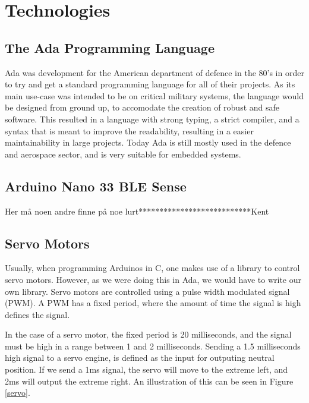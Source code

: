 \documentclass{article}
\begin{document}
\section{Technologies}

\subsection{The Ada Programming Language}
Ada was development for the American department of defence in the 80's in order to try and get a standard programming language for all of their projects. As its main use-case was intended to be on critical military systems, the language would be designed from ground up, to accomodate the creation of robust and safe software. This resulted in a language with strong typing, a strict compiler, and a syntax that is meant to improve the readability, resulting in a easier maintainability in large projects. Today Ada is still mostly used in the defence and aerospace sector, and is very suitable for embedded systems.\\


\subsection{Arduino Nano 33 BLE Sense}

Her må noen andre finne på noe lurt***************************Kent



\subsection{Servo Motors}
Usually, when programming Arduinos in C, one makes use of a library to control servo motors. However, as we were doing this in Ada, we would have to write our own library. Servo motors are controlled using a pulse width modulated signal (PWM). A PWM has a fixed period, where the amount of time the signal is high defines the signal. 

In the case of a servo motor, the fixed period is 20 milliseconds, and the signal must be high in a range between 1 and 2 milliseconds. Sending a 1.5 milliseconds high signal to a servo engine, is defined as the input for outputing neutral position. If we send a 1ms signal, the servo will move to the extreme left, and 2ms will output the extreme right. An illustration of this can be seen in Figure \ref{servo}.
\end{document}
